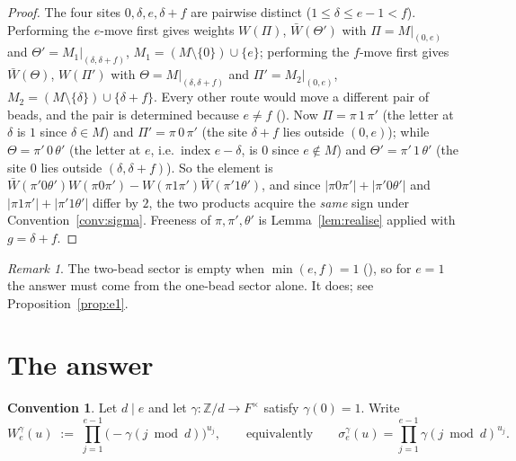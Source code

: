 \documentclass[11pt]{article}
\theoremstyle{definition}
\newtheorem{convention}[theorem]{Convention}
\theoremstyle{remark}
\newtheorem{remark}[theorem]{Remark}
\newcommand{\Z}{\mathbb{Z}}
\begin{document}
\begin{proof}
The four sites $0,\delta,e,\delta+f$ are pairwise distinct ($1\le\delta\le e-1<f$).
Performing the $e$-move first gives weights $W(\Pi)$, $\bar W(\Theta')$ with
$\Pi=M|_{(0,e)}$ and $\Theta'=M_1|_{(\delta,\delta+f)}$, $M_1=(M\setminus\{0\})\cup\{e\}$;
performing the $f$-move first gives $\bar W(\Theta)$, $W(\Pi')$ with
$\Theta=M|_{(\delta,\delta+f)}$ and $\Pi'=M_2|_{(0,e)}$,
$M_2=(M\setminus\{\delta\})\cup\{\delta+f\}$.  Every other route would move a different
pair of beads, and the pair is determined because $e\ne f$ (\cite[Thm.~5(2)]{Q92}).
Now $\Pi=\pi\,1\,\pi'$ (the letter at $\delta$ is $1$ since $\delta\in M$) and
$\Pi'=\pi\,0\,\pi'$ (the site $\delta+f$ lies outside $(0,e)$); while
$\Theta=\pi'\,0\,\theta'$ (the letter at $e$, i.e.\ index $e-\delta$, is $0$ since
$e\notin M$) and $\Theta'=\pi'\,1\,\theta'$ (the site $0$ lies outside
$(\delta,\delta+f)$).  So the element is
$\bar W(\pi'0\theta')W(\pi0\pi')-W(\pi1\pi')\bar W(\pi'1\theta')$, and since
$|\pi0\pi'|+|\pi'0\theta'|$ and $|\pi1\pi'|+|\pi'1\theta'|$ differ by $2$, the two
products acquire the \emph{same} sign under Convention~\ref{conv:sigma}.  Freeness of
$\pi,\pi',\theta'$ is Lemma~\ref{lem:realise} applied with $g=\delta+f$.
\end{proof}

\begin{remark}
The two-bead sector is empty when $\min(e,f)=1$ (\cite[Cor.~9]{Q92}), so for $e=1$ the
answer must come from the one-bead sector alone.  It does; see
Proposition~\ref{prop:e1}.
\end{remark}

\section{The answer}

\begin{convention}\label{conv:gamma}
Let $d\mid e$ and let $\gamma:\Z/d\to F^{\times}$ satisfy $\gamma(0)=1$.  Write
\[
   W^{\gamma}_e(u)\;:=\;\prod_{j=1}^{e-1}\bigl(-\gamma(j\bmod d)\bigr)^{u_j},
   \qquad\text{equivalently}\qquad
   \sigma^{\gamma}_e(u)=\prod_{j=1}^{e-1}\gamma(j\bmod d)^{u_j}.
\]
\end{convention}
\end{document}
